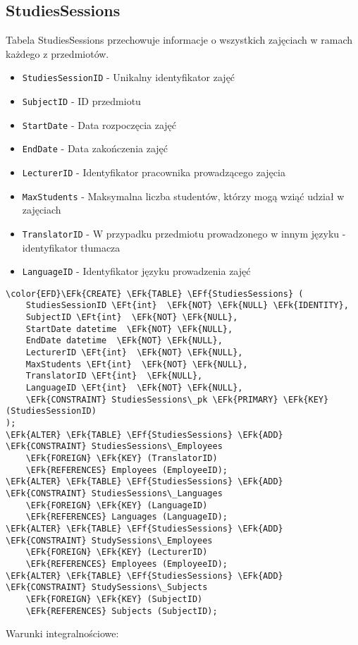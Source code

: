 \documentclass[11pt]{article}
\newcommand{\EFk}[1]{\textcolor{EFk}{\textbf{#1}}} %
\newcommand{\EFf}[1]{\textcolor{EFf}{#1}} %
\newcommand{\EFt}[1]{\textcolor{EFt}{\textbf{#1}}} %
\begin{document}
\subsection{StudiesSessions}
\label{sec:org6c25843}
Tabela StudiesSessions przechowuje informacje o wszystkich zajęciach w ramach każdego z przedmiotów.
\begin{itemize}
\item \texttt{StudiesSessionID} - Unikalny identyfikator zajęć
\item \texttt{SubjectID} - ID przedmiotu
\item \texttt{StartDate} - Data rozpoczęcia zajęć
\item \texttt{EndDate} - Data zakończenia zajęć
\item \texttt{LecturerID} - Identyfikator pracownika prowadzącego zajęcia
\item \texttt{MaxStudents} - Maksymalna liczba studentów, którzy mogą wziąć udział w zajęciach
\item \texttt{TranslatorID} - W przypadku przedmiotu prowadzonego w innym języku - identyfikator tłumacza
\item \texttt{LanguageID} - Identyfikator języku prowadzenia zajęć
\end{itemize}
\begin{Code}
\begin{Verbatim}
\color{EFD}\EFk{CREATE} \EFk{TABLE} \EFf{StudiesSessions} (
    StudiesSessionID \EFt{int}  \EFk{NOT} \EFk{NULL} \EFk{IDENTITY},
    SubjectID \EFt{int}  \EFk{NOT} \EFk{NULL},
    StartDate datetime  \EFk{NOT} \EFk{NULL},
    EndDate datetime  \EFk{NOT} \EFk{NULL},
    LecturerID \EFt{int}  \EFk{NOT} \EFk{NULL},
    MaxStudents \EFt{int}  \EFk{NOT} \EFk{NULL},
    TranslatorID \EFt{int}  \EFk{NULL},
    LanguageID \EFt{int}  \EFk{NOT} \EFk{NULL},
    \EFk{CONSTRAINT} StudiesSessions\_pk \EFk{PRIMARY} \EFk{KEY}  (StudiesSessionID)
);
\EFk{ALTER} \EFk{TABLE} \EFf{StudiesSessions} \EFk{ADD} \EFk{CONSTRAINT} StudiesSessions\_Employees
    \EFk{FOREIGN} \EFk{KEY} (TranslatorID)
    \EFk{REFERENCES} Employees (EmployeeID);
\EFk{ALTER} \EFk{TABLE} \EFf{StudiesSessions} \EFk{ADD} \EFk{CONSTRAINT} StudiesSessions\_Languages
    \EFk{FOREIGN} \EFk{KEY} (LanguageID)
    \EFk{REFERENCES} Languages (LanguageID);
\EFk{ALTER} \EFk{TABLE} \EFf{StudiesSessions} \EFk{ADD} \EFk{CONSTRAINT} StudySessions\_Employees
    \EFk{FOREIGN} \EFk{KEY} (LecturerID)
    \EFk{REFERENCES} Employees (EmployeeID);
\EFk{ALTER} \EFk{TABLE} \EFf{StudiesSessions} \EFk{ADD} \EFk{CONSTRAINT} StudySessions\_Subjects
    \EFk{FOREIGN} \EFk{KEY} (SubjectID)
    \EFk{REFERENCES} Subjects (SubjectID);
\end{Verbatim}
\end{Code}
Warunki integralnościowe:
\end{document}
